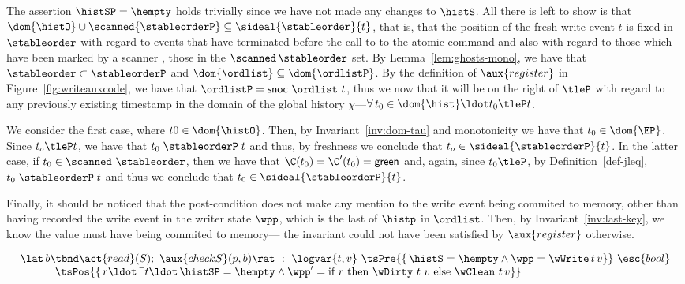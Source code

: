 The assertion $\histSP = \hempty$ holds trivially since we have not
made any changes to $\histS$. All there is left to show is that $
\dom{\histO} \cup \scanned{\stableorderP} \subseteq
\sideal{\stableorder}{t}$, that is, that the position of the fresh
write event $t$ is fixed in $\stableorder$ with regard to events that
have terminated before the call to to the atomic command and also with
regard to those which have been marked by a scanner \ie, those in the
$\scanned\, \stableorder$ set. By Lemma~\ref{lem:ghosts-mono}, we have
that $\stableorder \subset \stableorderP$ and $\dom{\ordlist}
\subseteq \dom{\ordlistP}$. By the definition of $\aux{register}$ in
Figure~\ref{fig:writeauxcode}, we have that $\ordlistP =
\mathsf{snoc}\ {\ordlist}\ t$, thus we now that it will be on the
right of $\tleP$ with regard to any previously existing timestamp in
the domain of the global history $\chi$---\ie $\forall\, t_0 \in
\dom{\hist}\ldot t_0 \tleP t$.

We consider the first case, where $t0 \in \dom{\histO}$. Then, by
Invariant~\ref{inv:dom-tau} and monotonicity we have that $t_0 \in
\dom{\EP}$. Since $t_o \tleP t$, we have that $ t_0
\mathrel{\stableorderP} t$ and thus, by freshness we conclude that
$t_o \in \sideal{\stableorderP}{t}$. In the latter case, if $ t_0 \in
\scanned\ \stableorder$, then we have that $\C (t_0) = \C' (t_0) =
\mathsf{green}$ and, again, since $t_0 \tleP$, by
Definition~\ref{def-jleq}, $t_0 \mathrel{\stableorderP} t$ and thus we
conclude that $ t_0 \in \sideal{\stableorderP}{t}$.



Finally, it should be noticed that the post-condition does not make
any mention to the write event being commited to memory, other than
having recorded the write event in the writer state $\wpp$, which is
the last of $\histp$ in $\ordlist$. Then, by
Invariant~\ref{inv:last-key}, we know the value must have being
commited to memory--- the invariant could not have been satisfied by
$\aux{register}$ otherwise.



\[
\begin{array}{l}
  \lat\, b \tbnd \act{read}(S);\ \aux{checkS}(p,b) \rat\ :\
    \logvar{t, v}\
    \tsPre{\{\, \histS = \hempty \wedge
      \wpp = \wWrite\, t\, v \}}\ \esc{bool} \\
    ~~~~ ~~~~
    \begin{array}[t]{l}
      \tsPos{\{\, r\ldot\, \exists t\ldot\, \histSP = \hempty \wedge
        \wpp' =  \textrm{if}\ r\
        \textrm{then}\ \wDirty\ t\, \,v\ \textrm{else}\ \wClean\ t\, v\}}
    \end{array}
\end{array}
\]





